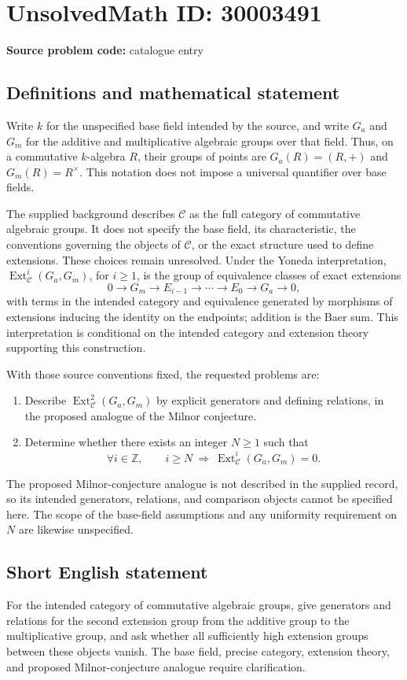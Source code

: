 \documentclass[11pt]{article}
\newcommand{\Z}{\mathbb{Z}}
\begin{document}
\section*{UnsolvedMath ID: 30003491}
\textbf{Source problem code:} catalogue entry
\subsection{Definitions and mathematical statement}
Write \(k\) for the unspecified base field intended by the source, and write \(G_a\) and \(G_m\) for the additive and multiplicative algebraic groups over that field. Thus, on a commutative \(k\)-algebra \(R\), their groups of points are \(G_a(R)=(R,+)\) and \(G_m(R)=R^\times\). This notation does not impose a universal quantifier over base fields.

The supplied background describes \(\mathcal C\) as the full category of commutative algebraic groups. It does not specify the base field, its characteristic, the conventions governing the objects of \(\mathcal C\), or the exact structure used to define extensions. These choices remain unresolved. Under the Yoneda interpretation, \(\operatorname{Ext}^i_{\mathcal C}(G_a,G_m)\), for \(i\geq 1\), is the group of equivalence classes of exact extensions
\[
0\longrightarrow G_m\longrightarrow E_{i-1}\longrightarrow\cdots\longrightarrow E_0\longrightarrow G_a\longrightarrow 0,
\]
with terms in the intended category and equivalence generated by morphisms of extensions inducing the identity on the endpoints; addition is the Baer sum. This interpretation is conditional on the intended category and extension theory supporting this construction.

With those source conventions fixed, the requested problems are:
\begin{enumerate}
\item Describe \(\operatorname{Ext}^2_{\mathcal C}(G_a,G_m)\) by explicit generators and defining relations, in the proposed analogue of the Milnor conjecture.
\item Determine whether there exists an integer \(N\geq 1\) such that
\[
\forall i\in\Z,\qquad i\geq N\ \Longrightarrow\ \operatorname{Ext}^i_{\mathcal C}(G_a,G_m)=0.
\]
\end{enumerate}
The proposed Milnor-conjecture analogue is not described in the supplied record, so its intended generators, relations, and comparison objects cannot be specified here. The scope of the base-field assumptions and any uniformity requirement on \(N\) are likewise unspecified.
\subsection{Short English statement}
For the intended category of commutative algebraic groups, give generators and relations for the second extension group from the additive group to the multiplicative group, and ask whether all sufficiently high extension groups between these objects vanish. The base field, precise category, extension theory, and proposed Milnor-conjecture analogue require clarification.
\end{document}
